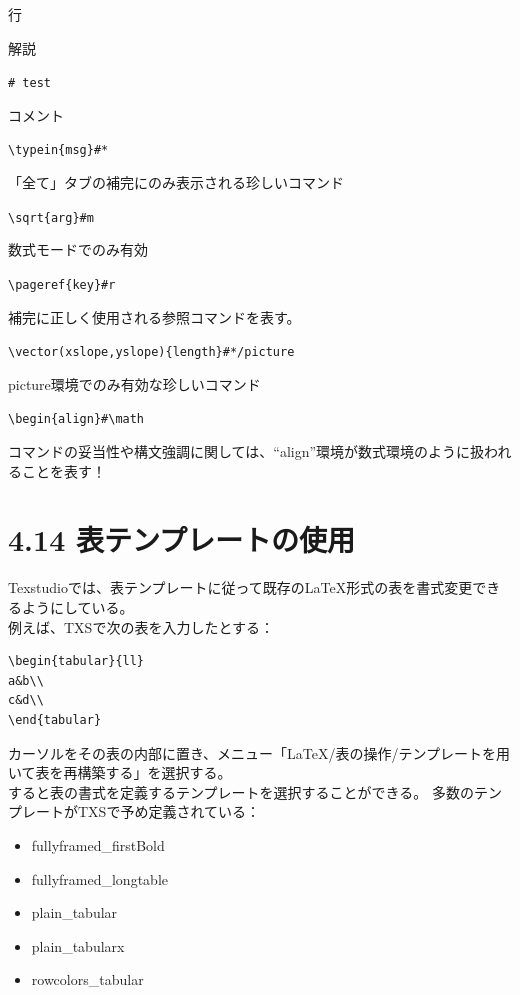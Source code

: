 \documentclass[]{book}
\begin{document}
行

解説

\lstinline!# test!

コメント

\lstinline!\typein{msg}#*!

「全て」タブの補完にのみ表示される珍しいコマンド

\lstinline!\sqrt{arg}#m!

数式モードでのみ有効

\lstinline!\pageref{key}#r!

補完に正しく使用される参照コマンドを表す。

\lstinline!\vector(xslope,yslope){length}#*/picture!

picture環境でのみ有効な珍しいコマンド

\lstinline!\begin{align}#\math!

コマンドの妥当性や構文強調に関しては、``align''環境が数式環境のように扱われることを表す！

\section{4.14 表テンプレートの使用}

Texstudioでは、表テンプレートに従って既存のLaTeX形式の表を書式変更できるようにしている。\\
例えば、TXSで次の表を入力したとする：

\begin{lstlisting}
\begin{tabular}{ll}
a&b\\
c&d\\
\end{tabular}
\end{lstlisting}

カーソルをその表の内部に置き、メニュー「LaTeX/表の操作/テンプレートを用いて表を再構築する」を選択する。\\
すると表の書式を定義するテンプレートを選択することができる。
多数のテンプレートがTXSで予め定義されている：

\begin{itemize}
\item
  fullyframed\_firstBold
\item
  fullyframed\_longtable
\item
  plain\_tabular
\item
  plain\_tabularx
\item
  rowcolors\_tabular
\end{itemize}
\end{document}
